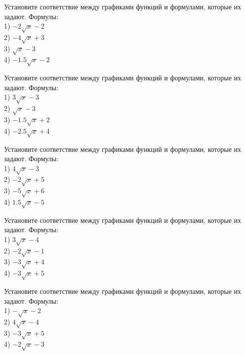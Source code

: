 \documentclass[4apaper]{article}
\begin{document}
\begin{taskBN}{91}
Установите соответствие между графиками функций и формулами, которые их задают. Формулы: \\1) $-2\sqrt{x}-2$\\2) $-4\sqrt{x}+3$\\3) $\sqrt{x}-3$\\4) $-1.5\sqrt{x}-2$
\end{taskBN}

\begin{taskBN}{92}
Установите соответствие между графиками функций и формулами, которые их задают. Формулы: \\1) $3\sqrt{x}-3$\\2) $\sqrt{x}-3$\\3) $-1.5\sqrt{x}+2$\\4) $-2.5\sqrt{x}+4$
\end{taskBN}

\begin{taskBN}{93}
Установите соответствие между графиками функций и формулами, которые их задают. Формулы: \\1) $4\sqrt{x}-3$\\2) $-2\sqrt{x}+5$\\3) $-5\sqrt{x}+6$\\4) $1.5\sqrt{x}-5$
\end{taskBN}

\begin{taskBN}{94}
Установите соответствие между графиками функций и формулами, которые их задают. Формулы: \\1) $3\sqrt{x}-4$\\2) $-2\sqrt{x}-1$\\3) $-3\sqrt{x}+4$\\4) $-3\sqrt{x}+5$
\end{taskBN}

\begin{taskBN}{95}
Установите соответствие между графиками функций и формулами, которые их задают. Формулы: \\1) $-\sqrt{x}-2$\\2) $4\sqrt{x}-4$\\3) $-3\sqrt{x}+5$\\4) $-2\sqrt{x}-3$
\end{taskBN}
\end{document}
